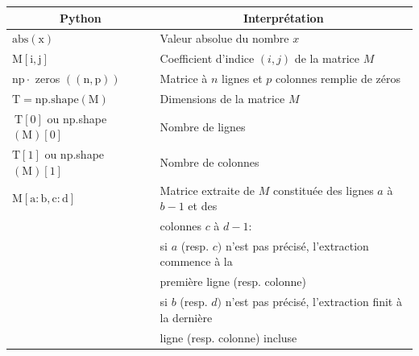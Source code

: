 \begin{exercice} 
\begin{center}
\begin{tabular}{ll}
\hline \multicolumn{1}{c}{ Python } & \multicolumn{1}{c}{ Interprétation } \\
\hline $\mathrm{abs}(\mathrm{x})$ & Valeur absolue du nombre $x$ \\
\hline $\mathrm{M}[\mathrm{i}, \mathrm{j}]$ & Coefficient d'indice $(i, j)$ de la matrice $M$ \\
\hline $\mathrm{np} \cdot$ zeros $((\mathrm{n}, \mathrm{p}))$ & Matrice à $n$ lignes et $p$ colonnes remplie de zéros \\
\hline $\mathrm{T}=\mathrm{np} . \mathrm{shape}(\mathrm{M})$ & Dimensions de la matrice $M$ \\
$\mathrm{~T}[0]$ ou np.shape $(\mathrm{M})[0]$ & Nombre de lignes \\
$\mathrm{T}[1]$ ou np.shape $(\mathrm{M})[1]$ & Nombre de colonnes \\
\hline $\mathrm{M}[\mathrm{a}: \mathrm{b}, \mathrm{c}: \mathrm{d}]$ & Matrice extraite de $M$ constituée des lignes $a$ à $b-1$ et des \\
& colonnes $c$ à $d-1:$ \\
& si $a$ (resp. $c)$ n'est pas précisé, l'extraction commence à la \\
& première ligne (resp. colonne) \\
& si $b$ (resp. $d)$ n'est pas précisé, l'extraction finit à la dernière \\
& ligne (resp. colonne) incluse \\
\hline
\end{tabular}
\end{center}
\end{exercice}


\begin{correction}

\end{correction}
